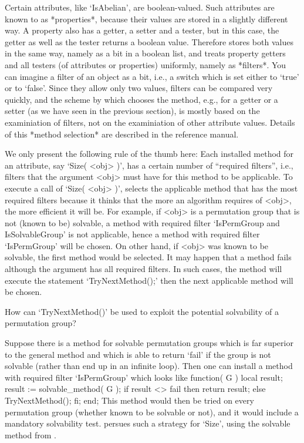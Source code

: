 %
%
Certain attributes, like `IsAbelian', are boolean-valued. Such attributes
are known to {\GAP} as *properties*, because their values are stored in a
slightly different way. A  property  also has a   getter, a setter  and a
tester, but  in this case,  the getter as  well  as the  tester returns a
boolean   value. Therefore {\GAP} stores  both  values  in  the same way,
namely as  a bit in  a boolean list, and  treats property getters and all
testers (of attributes or properties) uniformly, namely as *filters*. You
can imagine a filter of an  object as a bit,  i.e., a switch which is set
either to `true' or to `false'. Since they allow only two values, filters
can be compared very quickly, and the  scheme by which {\GAP} chooses the
method, e.g., for a getter or  a setter (as we  have seen in the previous
section),  is mostly based  on the  examiniation  of filters, not  on the
examiniation   of   other  attribute values.    Details  of this  *method
selection* are described in the reference manual.

We only   present the following rule  of  the thumb here:  Each installed
method for an  attribute, say `Size( <obj>   )', has a certain number  of
``required filters'', i.e., filters that the argument <obj> must have for
this method  to be applicable.  To execute  a  call  of `Size( <obj>  )',
{\GAP}  selects the applicable method  that has the most required filters
because it thinks that the more an algorithm  requires of <obj>, the more
efficient it will be.  For example, if  <obj> is a permutation group that
is not (known to be) solvable, a method with required filter `IsPermGroup
and IsSolvableGroup'  is  not  applicable, hence a  method  with required
filter `IsPermGroup' will be chosen. On other hand, if <obj> was known to
be solvable, the  first method would be selected.   It may happen  that a
method  fails although  the argument  has  all required filters.  In such
cases, the method will  execute the statement `TryNextMethod();' then the
next applicable method will be chosen.

%
\exercise How  can  `TryNextMethod()' be used   to exploit  the potential
solvability of a permutation group?

\answer Suppose  there is a method for  solvable permutation groups which
is far superior to the general method and which  is able to return `fail'
if the  group is not solvable  (rather than end up  in an infinite loop).
Then one can install a  method with  required filter `IsPermGroup'  which
looks like
\begintt
    function( G )
    local  result;
        result := solvable_method( G );
        if result <> fail  then  return result;
                           else  TryNextMethod();  fi;
    end;
\endtt
This method would then be tried on every permutation group (whether known
to be  solvable or  not),  and it would  include a  mandatory solvability
test.  {\GAP} persues  such  a strategy for   `Size',  using the solvable
method from \cite{Sims90b}.


